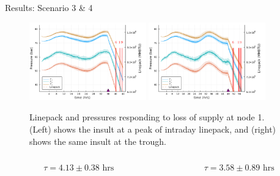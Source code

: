\begin{frame}{Results: Scenario 3 \& 4}
  \begin{figure}
    \centering
    \includegraphics[width=0.45\textwidth]{ScenarioResults/scen3.png}\hspace{0.6cm}%
    \includegraphics[width=0.45\textwidth]{ScenarioResults/scen4.png}
    \caption{Linepack and pressures responding to loss of supply at node 1. (Left) shows the insult at a peak of intraday linepack, and (right) shows the same insult at the trough.}
  \end{figure}
  \begin{columns}
    \begin{column}{0.5\textwidth}
      \begin{equation*}
        \tau = 4.13 \pm 0.38 \text{ hrs}
      \end{equation*}
    \end{column}

    \begin{column}{0.5\textwidth}
      \begin{equation*}
        \tau = 3.58 \pm 0.89 \text{ hrs}
      \end{equation*}
    \end{column}
  \end{columns}
\end{frame}


